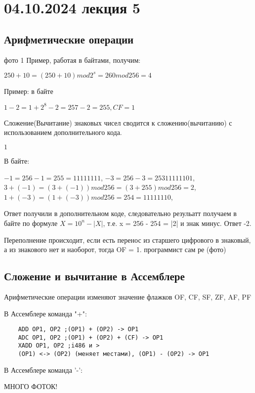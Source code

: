 \section{04.10.2024 лекция 5}
\subsection{Арифметические операции}
фото 1
Пример, работая в байтами, получим:
\begin{center}
    $250 + 10 = (250 + 10) mod 2^{s} = 260 mod 256 = 4$ 
\end{center}

Пример: в байте 
\begin{center}
    $1- 2 = 1 + 2^{8} - 2 = 257 - 2 = 255, CF = 1$ 
\end{center}

Сложение(Вычитание) знаковых чисел сводится к сложению(вычитанию) с использованием дополнительного кода.
\begin{center}
    $1$ 
\end{center}
В байте:
\begin{center}
    $-1 = 256 - 1 = 255 = 11111111$,
    $-3 = 256 - 3 = 253 11111101$,
    $3 + (-1) = (3 + (-1)) mod 256 = (3+ 255) mod 256 = 2$,
    $1 + (-3) = (1 + (-3)) mod 256 = 254 = 11111110$,
\end{center}
Ответ получили в дополнительном коде, следовательно резульатт получаем в байте по формуле $X = 10^{n} - |X|$, т.е.
x = 256 - 254 = |2| и знак минус. Ответ -2.

Переполнение происходит, если есть перенос из старшего цифрового в знаковый, а из знакового нет и наоборот, тогда OF = 1. программист сам ре (фото)

\subsection{Сложение и вычитание в Ассемблере}
Арифметические операции изменяют значение флажков OF, CF, SF, ZF, AF, PF

В Ассемблере команда "+":
\begin{verbatim}
    ADD OP1, OP2 ;(OP1) + (OP2) -> OP1
    ADC OP1, OP2 ;(OP1) + (OP2) + (CF) -> OP1
    XADD OP1, OP2 ;i486 и >
    (OP1) <-> (OP2) (меняет местами), (OP1) - (OP2) -> OP1                                

\end{verbatim}

В Ассемблере команда '-':


МНОГО ФОТОК!

